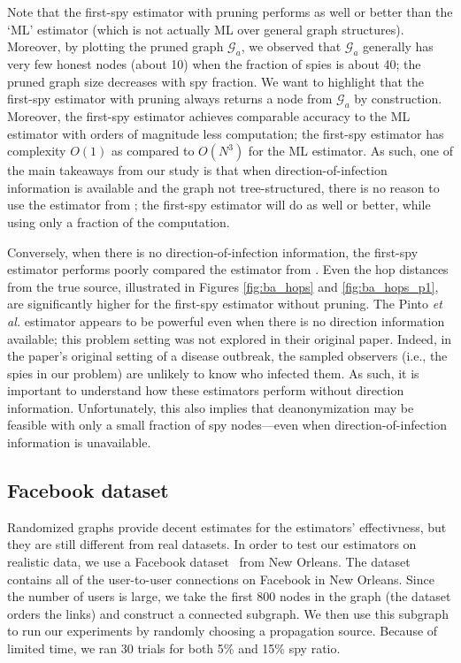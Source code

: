 Note that the first-spy estimator with pruning performs as well or better than the `ML' estimator (which is not actually ML over general graph structures). Moreover, by plotting the pruned graph $\mathcal G_a$, we observed that $\mathcal G_a$ generally has very few honest nodes (about 10) when the fraction of spies is about 40; the pruned graph size decreases with spy fraction. 
We want to highlight that the first-spy estimator with pruning always returns a node from $\mathcal G_a$ by construction.  Moreover, the first-spy estimator achieves comparable accuracy to the ML estimator with orders of magnitude less computation; the first-spy estimator has complexity $O(1)$ as compared to $O(N^3)$ for the ML estimator. As such, one of the main takeaways from our study is that when direction-of-infection information is available and the graph not tree-structured, there is no reason to use the estimator from \cite{pinto}; the first-spy estimator will do as well or better, while using only a fraction of the computation. 

Conversely, when there is no direction-of-infection information, the first-spy estimator performs poorly compared the estimator from \cite{pinto}. Even the hop distances from the true source, illustrated in Figures \ref{fig:ba_hops} and \ref{fig:ba_hops_p1}, are significantly higher for the first-spy estimator without pruning. The Pinto \emph{et al.} estimator appears to be powerful even when there is no direction information available; this problem setting was not explored in their original paper. Indeed, in the paper's original setting of a disease outbreak, the sampled observers (i.e., the spies in our problem) are unlikely to know who infected them. As such, it is important to understand how these estimators perform without direction information. Unfortunately, this also implies that deanonymization may be feasible with only a small fraction of spy nodes---even when direction-of-infection information is unavailable.




\subsection{Facebook dataset}

Randomized graphs provide decent estimates for the estimators' effectivness, but they are still different from real datasets. In order to test our estimators on realistic data, we use a Facebook dataset~\cite{viswanath-2009-activity} from New Orleans. The dataset contains all of the user-to-user connections on Facebook in New Orleans. Since the number of users is large, we take the first 800 nodes in the graph (the dataset orders the links) and construct a connected subgraph. We then use this subgraph to run our experiments by randomly choosing a propagation source. Because of limited time, we ran 30 trials for both 5\% and 15\% spy ratio.


